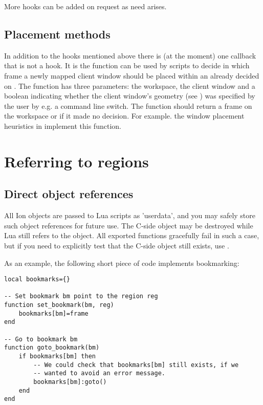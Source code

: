 More hooks can be added on request as need arises.

\subsection{Placement methods}

In addition to the hooks mentioned above there is (at the moment) 
one callback that is not a hook. It is the function
 can be used by scripts to decide
in which frame a newly mapped client window should be placed 
within an already decided on . The function has
three parameters: the workspace, the client window and a boolean
indicating whether the client window's geometry (see
) was specified by the user by e.g. a
 command line switch. The function should
return a frame on the workspace or  if it made no
decision. For example. the window placement heuristics in 
 implement this function.

\section{Referring to regions}

\subsection{Direct object references}

All Ion objects are passed to Lua scripts as 'userdata', and you may
safely store such object references for future use. The C-side object
may be destroyed while Lua still refers to the object. All exported
functions gracefully fail in such a case, but if you need to explicitly
test that the C-side object still exists, use .

As an example, the following short piece of code implements 
bookmarking:

\begin{verbatim}
local bookmarks={}

-- Set bookmark bm point to the region reg
function set_bookmark(bm, reg)
    bookmarks[bm]=frame
end

-- Go to bookmark bm
function goto_bookmark(bm)
    if bookmarks[bm] then
        -- We could check that bookmarks[bm] still exists, if we
        -- wanted to avoid an error message.
        bookmarks[bm]:goto()
    end
end
\end{verbatim}

